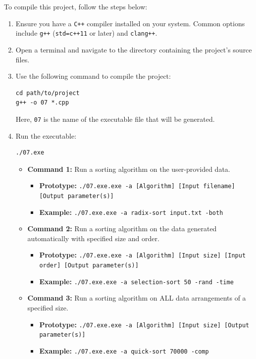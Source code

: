 To compile this project, follow the steps below:
\begin{enumerate}
    \item Ensure you have a \texttt{C++} compiler installed on your system. Common options include \texttt{g++} (\texttt{std=c++11} or later) and \texttt{clang++}.
    \item Open a terminal and navigate to the directory containing the project's source files.
    \item Use the following command to compile the project:

\begin{verbatim}
cd path/to/project
g++ -o 07 *.cpp
\end{verbatim}

Here, \texttt{07} is the name of the executable file that will be generated.

    \item Run the executable:

\begin{verbatim}
./07.exe
\end{verbatim}

\begin{itemize}
    \item \textbf{Command 1:} Run a sorting algorithm on the user-provided data.
        \begin{itemize}[label=--]
            \item \textbf{Prototype:} \texttt{./07.exe.exe -a [Algorithm] [Input filename] [Output parameter(s)]}
            \item \textbf{Example:} \texttt{./07.exe.exe -a radix-sort input.txt -both}
        \end{itemize}
        
    \item \textbf{Command 2:} Run a sorting algorithm on the data generated automatically with specified size and order.
        \begin{itemize}[label=--]
            \item \textbf{Prototype:} \texttt{./07.exe.exe -a [Algorithm] [Input size] [Input order] [Output parameter(s)]}
            \item \textbf{Example:} \texttt{./07.exe.exe -a selection-sort 50 -rand -time}
        \end{itemize}
    
    \item \textbf{Command 3:} Run a sorting algorithm on ALL data arrangements of a specified size.
        \begin{itemize}[label=--]
            \item \textbf{Prototype:} \texttt{./07.exe.exe -a [Algorithm] [Input size] [Output parameter(s)]}
            \item \textbf{Example:} \texttt{./07.exe.exe -a quick-sort 70000 -comp}
        \end{itemize}


\end{itemize}
\end{enumerate}
